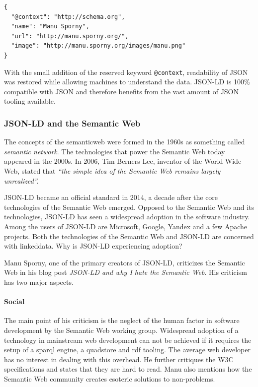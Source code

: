 \lstset{language=JSON}
\begin{lstlisting}[caption=Compacted JSON-LD data of a person. \citep{jsonldbasicconcepts}, label=jsonldcompacted]
{
  "@context": "http://schema.org",
  "name": "Manu Sporny",
  "url": "http://manu.sporny.org/",
  "image": "http://manu.sporny.org/images/manu.png"
}
\end{lstlisting}

With the small addition of the reserved keyword \lstinline{@context}, readability of JSON was restored while allowing machines to understand the data. JSON-LD is 100\% compatible with JSON and therefore benefits from the vast amount of JSON tooling available.


\subsubsection{JSON-LD and the Semantic Web}
The concepts of the \gls{semanticweb} were formed in the 1960s as something called \textit{semantic network}. The technologies that power the Semantic Web today appeared in the 2000s. In 2006, Tim Berners-Lee, inventor of the World Wide Web, stated that \textit{``the simple idea of the Semantic Web remains largely unrealized''.} \citep{semanticwebrevisited}

JSON-LD became an official standard in 2014, a decade after the core technologies of the Semantic Web emerged. Opposed to the Semantic Web and its technologies, JSON-LD has seen a widespread adoption in the software industry. Among the users of JSON-LD are Microsoft, Google, Yandex and a few Apache projects. \citep{jsonldusers} Both the technologies of the Semantic Web and JSON-LD are concerned with \gls{linkeddata}. Why is JSON-LD experiencing adoption?

Manu Sporny, one of the primary creators of JSON-LD, criticizes the Semantic Web in his blog post \textit{JSON-LD and why I hate the Semantic Web}. His criticism has two major aspects.

\paragraph{Social}
The main point of his criticism is the neglect of the human factor in software development by the Semantic Web working group. Widespread adoption of a technology in mainstream web development can not be achieved if it requires the setup of a \gls{sparql} engine, a \gls{quadstore} and \gls{rdf} tooling. The average web developer has no interest in dealing with this overhead. He further critiques the W3C specifications and states that they are hard to read. \citep{semanticwebrevisited} Manu also mentions how the Semantic Web community creates esoteric solutions to non-problems. \citep{semanticwebrevisited}

